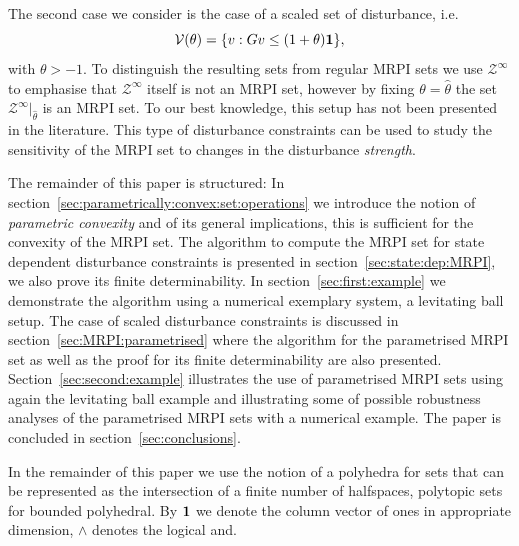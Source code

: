 \documentclass[letterpaper, 10pt, conference]{ieeeconf} %
\begin{document}
The second case we consider is the case of a scaled set of disturbance, i.e.
\begin{equation}
  \mathcal V(\theta) = \{v:Gv\leq(1+\theta){\bf{1}}\},
\end{equation}
with $\theta>-1$. To distinguish the resulting sets from regular MRPI sets we use $\mathcal Z^\infty$
to emphasise that $\mathcal Z^\infty$ itself is not an MRPI set, however by fixing $\theta=\hat\theta$ the
set $\mathcal Z^\infty\vert_{\hat\theta}$ is an MRPI set. To our best knowledge, this setup has not been 
presented in the literature. This type of disturbance constraints can be used to study the sensitivity of
the MRPI set to changes in the disturbance \emph{strength}.

The remainder of this paper is structured: In section~\ref{sec:parametrically:convex:set:operations} we
introduce the notion of \emph{parametric convexity} and of its general implications, this is sufficient 
for the convexity of the MRPI set. The algorithm to compute the MRPI set for state dependent disturbance
constraints is presented in section~\ref{sec:state:dep:MRPI}, we also prove its finite determinability.
In section~\ref{sec:first:example} we demonstrate the algorithm using a numerical exemplary system, a
levitating ball setup. The case of scaled disturbance constraints is discussed in section~\ref{sec:MRPI:parametrised}
where the algorithm for the parametrised MRPI set as well as the proof for its finite determinability
are also presented. Section~\ref{sec:second:example} illustrates the use of parametrised MRPI sets using
again the levitating ball example and illustrating some of possible robustness analyses of the parametrised
MRPI sets with a numerical example. The paper is concluded in section~\ref{sec:conclusions}.

In the remainder of this paper we use the notion of a polyhedra for sets that can be represented as
the intersection of a finite number of halfspaces, polytopic sets for bounded polyhedral.
By ${\bf{1}}$ we denote the column vector of ones in appropriate dimension, $\wedge$ denotes the logical and. 
%
%
%
\end{document}
